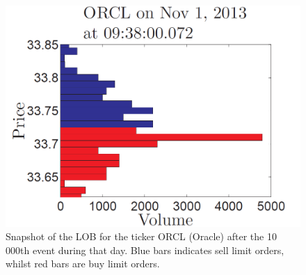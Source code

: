 \documentclass{kththesis}
\theoremstyle{definition}
\begin{document}
\begin{figure}[H]
    \centering
    \includegraphics[scale=.65]{LOBex.PNG}
    \caption{Snapshot of the LOB for the ticker ORCL (Oracle) after the 10 000th event during that day. Blue bars indicates sell limit orders, whilst red bars are buy limit orders.}
    \label{fig:2}
\end{figure}
\end{document}
